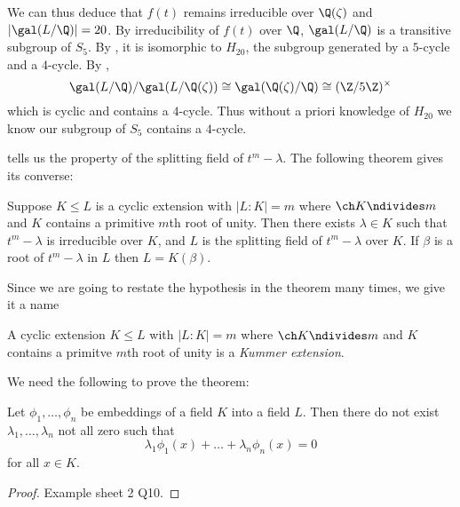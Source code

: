 \documentclass[a4paper]{article}
\begin{document}
\begin{eg}
\begin{enumerate}
   We can thus deduce that \(f(t)\) remains irreducible over \(\Q(\zeta)\) and \(|\gal(L/\Q)| = 20\). By irreducibility of \(f(t)\) over \(\Q\), \(\gal(L/\Q)\) is a transitive subgroup of \(S_5\). By , it is isomorphic to \(H_{20}\), the subgroup generated by a \(5\)-cycle and a \(4\)-cycle. By ,
   \[
     \gal(L/\Q)/\gal(L/\Q(\zeta)) \cong \gal(\Q(\zeta)/\Q) \cong (\Z/5\Z)^\times
   \]
   which is cyclic and contains a \(4\)-cycle. Thus without a priori knowledge of \(H_{20}\) we know our subgroup of \(S_5\) contains a \(4\)-cycle.
 \end{enumerate}
\end{eg}

 tells us the property of the splitting field of \(t^m - \lambda\). The following theorem gives its converse:

\begin{theorem}
  \label{thm:kummer theory}
  Suppose \(K \leq L\) is a cyclic extension with \(|L:K| = m\) where \(\ch K \ndivides m\) and \(K\) contains a primitive \(m\)th root of unity. Then there exists \(\lambda \in K\) such that \(t^m - \lambda\) is irreducible over \(K\), and \(L\) is the splitting field of \(t^m - \lambda\) over \(K\). If \(\beta\) is a root of \(t^m - \lambda\) in \(L\) then \(L = K(\beta)\).
\end{theorem}

Since we are going to restate the hypothesis in the theorem many times, we give it a name

\begin{definition}
  A cyclic extension \(K \leq L\) with \(|L:K| = m\) where \(\ch K \ndivides m\) and \(K\) contains a primitve \(m\)th root of unity is a \emph{Kummer extension}.
\end{definition}

We need the following to prove the theorem:

\begin{lemma}
  \label{lem:linear independence of group characters}
  Let \(\phi_1, \dots, \phi_n\) be embeddings of a field \(K\) into a field \(L\). Then there do not exist \(\lambda_1, \dots, \lambda_n\) not all zero such that
  \[
    \lambda_1 \phi_1(x) + \dots + \lambda_n \phi_n(x) = 0
  \]
  for all \(x \in K\).
\end{lemma}

\begin{proof}
  Example sheet 2 Q10.
\end{proof}
\end{document}

